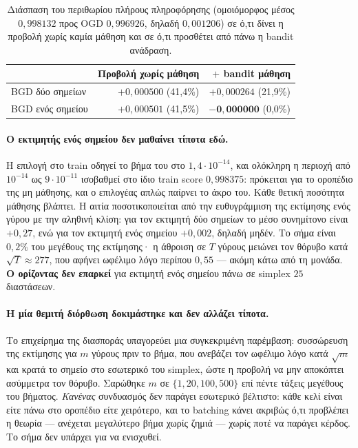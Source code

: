 \documentclass[12pt,a4paper,oneside]{report}
\renewcommand{\_}{\oldunderscore\allowbreak}
\theoremstyle{definition}
\theoremstyle{plain}
\theoremstyle{remark}
\begin{document}
\begin{table}[H]
\centering
\small
\begin{tabular}{lrr}
\toprule
& \textbf{Προβολή χωρίς μάθηση} & \textbf{$+$ bandit μάθηση} \\
\midrule
BGD δύο σημείων & $+0{,}000500$ \;(41,4\%) & $+0{,}000264$ \;(21,9\%) \\
BGD ενός σημείου & $+0{,}000501$ \;(41,5\%) & $\mathbf{-0{,}000000}$ \;(0,0\%) \\
\bottomrule
\end{tabular}
\caption{Διάσπαση του περιθωρίου πλήρους πληροφόρησης (ομοιόμορφος μέσος $0{,}998132$ προς
OGD $0{,}996926$, δηλαδή $0{,}001206$) σε ό,τι δίνει η προβολή χωρίς καμία μάθηση και σε ό,τι
προσθέτει από πάνω η bandit ανάδραση.}
\label{tab:bandit-decomp}
\end{table}

\paragraph{Ο εκτιμητής ενός σημείου δεν μαθαίνει τίποτα εδώ.} Η επιλογή στο train οδηγεί το
βήμα του στο $1{,}4\cdot10^{-14}$, και ολόκληρη η περιοχή από $10^{-14}$ ως $9\cdot10^{-11}$
ισοβαθμεί στο ίδιο train score $0{,}998375$: πρόκειται για το οροπέδιο της μη μάθησης, και ο
επιλογέας απλώς παίρνει το άκρο του. Κάθε θετική ποσότητα μάθησης βλάπτει. Η αιτία
ποσοτικοποιείται από την ευθυγράμμιση της εκτίμησης ενός γύρου με την αληθινή κλίση: για τον
εκτιμητή δύο σημείων το μέσο συνημίτονο είναι $+0{,}27$, ενώ για τον εκτιμητή ενός σημείου
$+0{,}002$, δηλαδή μηδέν. Το σήμα είναι $0{,}2\%$ του μεγέθους της εκτίμησης· η άθροιση σε
$T$ γύρους μειώνει τον θόρυβο κατά $\sqrt{T}\approx277$, που αφήνει ωφέλιμο λόγο περίπου
$0{,}55$ --- ακόμη κάτω από τη μονάδα. \textbf{Ο ορίζοντας δεν επαρκεί} για εκτιμητή ενός
σημείου πάνω σε simplex $25$ διαστάσεων.

\paragraph{Η μία θεμιτή διόρθωση δοκιμάστηκε και δεν αλλάζει τίποτα.} Το επιχείρημα της
διασποράς υπαγορεύει μια συγκεκριμένη παρέμβαση: συσσώρευση της εκτίμησης για $m$ γύρους πριν
το βήμα, που ανεβάζει τον ωφέλιμο λόγο κατά $\sqrt{m}$ και κρατά το σημείο στο εσωτερικό του
simplex, ώστε η προβολή να μην αποκόπτει ασύμμετρα τον θόρυβο. Σαρώθηκε $m$ σε
$\{1,20,100,500\}$ επί πέντε τάξεις μεγέθους του βήματος. \emph{Κανένας} συνδυασμός δεν
παράγει εσωτερικό βέλτιστο: κάθε κελί είναι είτε πάνω στο οροπέδιο είτε χειρότερο, και το
batching κάνει ακριβώς ό,τι προβλέπει η θεωρία --- ανέχεται μεγαλύτερο βήμα χωρίς ζημιά ---
χωρίς ποτέ να παράγει κέρδος. Το σήμα δεν υπάρχει για να ενισχυθεί.
\end{document}
